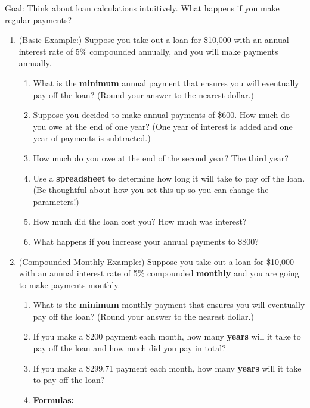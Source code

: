 \documentclass[12pt]{article}
\renewcommand{\emph}[1]{\textsf{\textbf{#1}}}
\begin{document}
Goal: Think about loan calculations intuitively. What happens if you make regular payments?

\begin{enumerate}
\item  (Basic Example:) Suppose you take out a loan for \$10,000 with an annual interest rate of 5\% compounded annually, and you will make payments annually.
	\begin{enumerate}
	\item What is the \emph{minimum} annual payment that ensures you will eventually pay off the loan? (Round your answer to the nearest dollar.)
	\vfill
	\item Suppose you decided to make annual payments of \$600. How much do you owe at the end of one year? (One year of interest is added and one year of payments is subtracted.)
	\vfill
	\item How much do you owe at the end of the second year? The third year?
	\vfill
	\item Use a \emph{spreadsheet} to determine how long it will take to pay off the loan. (Be thoughtful about how you set this up so you can change the parameters!)
	\vfill
	\item How much did the loan cost you? How much was interest?
	\vfill
	\item What happens if you increase your annual payments to \$800?
	\vfill
	\end{enumerate}
\newpage
\item (Compounded Monthly Example:) Suppose you take out a loan for \$10,000 with an annual interest rate of 5\% compounded \emph{monthly} and you are going to make payments monthly.
	\begin{enumerate}
	\item What is the \emph{minimum} monthly payment that ensures you will eventually pay off the loan? (Round your answer to the nearest dollar.)
	\vfill
	\item If you make a \$200 payment each month, how many \emph{years} will it take to pay off the loan and how much did you pay in total?
	\vfill
	\item If you make a \$299.71 payment each month, how many \emph{years} will it take to pay off the loan?
	\vfill
	
	\item \emph{Formulas:}
	

\end{enumerate}
\end{enumerate}
\end{document}
